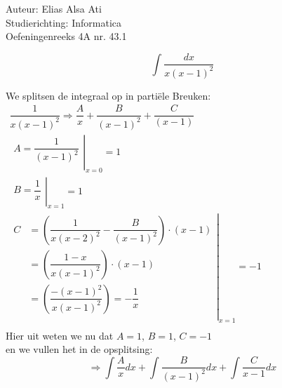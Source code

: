 \documentclass[a4paper]{article}
\newcommand{\integral}{\displaystyle\int}
\begin{document}
\noindent \large Auteur: Elias Alsa Ati         \\
\noindent \large Studierichting: Informatica    \\
\noindent \large Oefeningenreeks 4A nr. 43.1    \\

\medskip

\normalsize

$$\integral \dfrac{dx}{x(x-1)^2}$$

We splitsen de integraal op in partiële Breuken: \\

$\begin{array}{l}
    
    \dfrac{1}{x(x-1)^2} \Rightarrow \dfrac{A}{x} + \dfrac{B}{(x-1)^2} + \dfrac{C}{(x-1)} \\
    
    \left.
    \begin{array}{l}
        A = \dfrac{1}{(x-1)^2}  \\
    \end{array}
    \right|_{x=0} = 1           \\

    \left.
    \begin{array}{l}
        B = \dfrac{1}{x}        \\
    \end{array}
    \right|_{x=1} = 1           \\

    \left.
    \begin{array}{ll}
        C   &= \left(\dfrac{1}{x(x-2)^2} - \dfrac{B}{(x-1)^2}\right) \cdot (x - 1)     \\
            &= \left(\dfrac{1 - x}{x(x-1)^2}\right) \cdot (x-1)         \\
            &= \left(\dfrac{-(x-1)^2}{x(x-1)^2}\right) = - \dfrac{1}{x} \\
    \end{array}
    \right|_{x=1} = -1                                                  \\
\end{array}$    \\

Hier uit weten we nu dat $A = 1$, $B = 1$, $C = -1$ \\

en we vullen het in de opsplitsing:                 \\

$$ \Rightarrow \integral \dfrac{A}{x} dx + \integral \dfrac{B}{(x-1)^2} dx + \integral \dfrac{C}{x-1} dx $$
\end{document}
